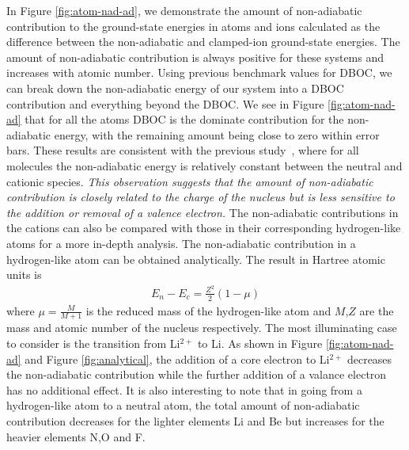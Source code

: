 \documentclass[pra,superscriptaddress,groupedaddress,twocolumn]{revtex4}
\begin{document}
In Figure \ref{fig:atom-nad-ad}, we demonstrate the amount of non-adiabatic contribution to the ground-state energies in atoms and ions calculated as the difference between the non-adiabatic and clamped-ion ground-state energies. The amount of non-adiabatic contribution is always positive for these systems and increases with atomic number. Using previous benchmark values for DBOC, we can break down the non-adiabatic energy of our system into a DBOC contribution and everything beyond the DBOC. We see in Figure \ref{fig:atom-nad-ad} that for all the atoms DBOC is the dominate contribution for the non-adiabatic energy, with the remaining amount being close to zero within error bars. These results are consistent with the previous study~\cite{Klopper_IP}, where for all molecules the non-adiabatic energy is relatively constant between the neutral and cationic species. \textit{This observation suggests that the amount of non-adiabatic contribution is closely related to the charge of the nucleus but is less sensitive to the addition or removal of a valence electron.} The non-adiabatic contributions in the cations can also be compared with those in their corresponding hydrogen-like atoms for a more in-depth analysis. The non-adiabatic contribution in a hydrogen-like atom can be obtained analytically. The result in Hartree atomic units is
\begin{align}
E_n-E_c=\frac{Z^2}{2}(1-\mu)
\end{align}
where $\mu=\frac{M}{M+1}$ is the reduced mass of the hydrogen-like atom and $M$,$Z$ are the mass and atomic number of the nucleus respectively. The most illuminating case to consider is the transition from Li$^{2+}$ to Li. As shown in Figure \ref{fig:atom-nad-ad} and Figure \ref{fig:analytical}, the addition of a core electron to Li$^{2+}$ decreases the non-adiabatic contribution while the further addition of a valance electron has no additional effect. It is also interesting to note that in going from a hydrogen-like atom to a neutral atom, the total amount of non-adiabatic contribution decreases for the lighter elements Li and Be but increases for the heavier elements N,O and F.

\end{document}

